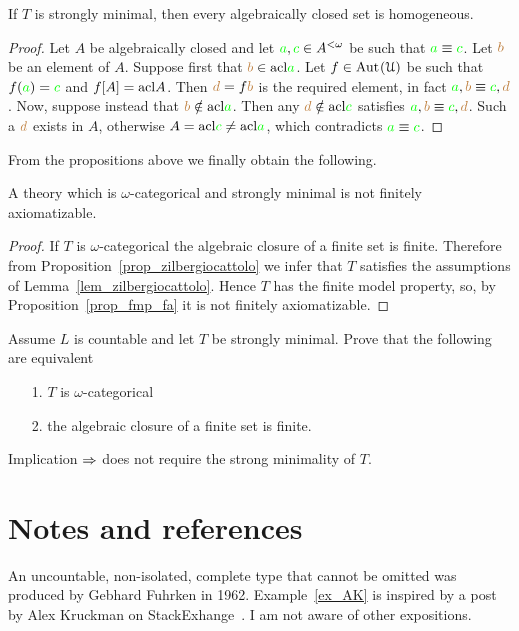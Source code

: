 \begin{proposition}\label{prop_zilbergiocattolo} If $T$ is strongly minimal, then every algebraically closed set is homogeneous.
\end{proposition}
\begin{proof}
Let $A$ be algebraically closed and let ${\color{green} a},{\color{green} c}\in A^{<\omega}$ be such that ${\color{green} a}\equiv{\color{green}c}$.
Let ${\color{brown} b}$ be an element of $A$.
Suppose first that ${\color{brown} b}\in{\rm acl}{\color{green}a}$.
Let $f\in{\rm Aut\kern.15ex}(\EuScript U)$ be such that $f({\color{green} a})={\color{green} c}$ and $f[A]={\rm acl} A$.
Then ${\color{brown} d}=f{\color{brown} b}$ is the required element, in fact ${\color{green} a},{\color{brown} b}\equiv {\color{green}c},{\color{brown} d}$.
Now, suppose instead that ${\color{brown} b}\notin{\rm acl}{\color{green}a}$.
Then any ${\color{brown} d}\notin{\rm acl}{\color{green}c}$ satisfies ${\color{green} a},{\color{brown} b}\equiv {\color{green}c},{\color{brown} d}$.
Such a ${\color{brown} d}$ exists in $A$, otherwise $A={\rm acl}{\color{green} c}\neq{\rm acl}{\color{green}a}$, which contradicts ${\color{green} a}\equiv {\color{green}c}$.
\end{proof}

From the propositions above we finally obtain the following.

\begin{theorem}\label{thm_zilbergiocattolo}
A theory which is $\omega$-categorical and strongly minimal is not finitely axiomatizable.
\end{theorem}

\begin{proof}
If $T$ is $\omega$-categorical the algebraic closure of a finite set is finite.
Therefore from Proposition~\ref{prop_zilbergiocattolo} we infer that $T$ satisfies the assumptions of Lemma~\ref{lem_zilbergiocattolo}.
Hence $T$ has the finite model property, so, by Proposition~\ref{prop_fmp_fa} it is not finitely axiomatizable.
\end{proof}


\begin{exercise} 
Assume $L$ is countable and let $T$ be strongly minimal.
Prove that the following are equivalent
\begin{itemize}
\item[1.] $T$ is $\omega$-categorical
\item[2.] the algebraic closure of a finite set is finite.
\end{itemize}
Implication $\Rightarrow$ does not require the strong minimality of $T$.
\end{exercise}


\section{Notes and references}
\label{Notes_countable}
An uncountable, non-isolated, complete type that cannot be omitted was produced by Gebhard Fuhrken in 1962.
Example~\ref{ex_AK} is inspired by a post by Alex Kruckman on StackExhange~\cite{AK}.
I am not aware of other expositions.


